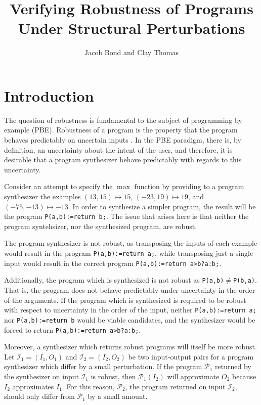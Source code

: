 \documentclass{llncs}
\title{Verifying Robustness of Programs Under Structural Perturbations}
\author{Jacob Bond and Clay Thomas}
\institute{Purdue University}
\begin{document}
\maketitle


\section{Introduction}

The question of robustness is fundamental to the subject of programming by
example (PBE).  Robustness of a program is the property that the program behaves
predictably on uncertain inputs \cite{chaudhuri12}.  In the PBE paradigm, there
is, by definition, an uncertainty about the intent of the user, and therefore,
it is desirable that a program synthesizer behave predictably with regards to
this uncertainty.

Consider an attempt to specify the \(\max\) function by providing to a program
synthesizer the examples \((13, 15) \mapsto 15\), \((-23, 19) \mapsto 19\), and
\((-75, -13) \mapsto -13\).  In order to synthesize a simpler program, the
result will be the program \verb!P(a,b):=return b;!.  The issue that arises here
is that neither the program syntehsizer, nor the synthesized program, are
robust.

The program synthesizer is not robust, as transposing the inputs of each example
would result in the program \verb!P(a,b):=return a;!, while transposing just a
single input would result in the correct program \verb!P(a,b):=return a>b?a:b;!.

Additionally, the program which is synthesized is not robust as
\verb!P(a,b)!\(\not=\)\verb!P(b,a)!.  That is, the program does not behave
predictably under uncertainty in the order of the arguments.  If the program
which is synthesized is required to be robust with respect to uncertainty in the
order of the input, neither \verb!P(a,b):=return a;! nor \verb!P(a,b):=return b!
would be viable candidates, and the synthesizer would be forced to return
\verb!P(a,b):=return a>b?a:b;!.

Moreover, a synthesizer which returns robust programs will itself be more
robust.  Let \(\mathcal{I}_{1} = (I_{1}, O_{1})\) and \(\mathcal{I}_{2} =
(I_{2}, O_{2})\) be two input-output pairs for a program synthesizer which
differ by a small perturbation.  If the program \(\mathcal{P}_{1}\) returned by
the synthesizer on input \(\mathcal{I}_{1}\) is robust, then
\(\mathcal{P}_{1}(I_{2})\) will approximate \(O_{2}\) because \(I_{2}\)
approximates \(I_{1}\).  For this reason, \(\mathcal{P}_{2}\), the program
returned on input \(\mathcal{I}_{2}\), should only differ from
\(\mathcal{P}_{1}\) by a small amount.
\end{document}
